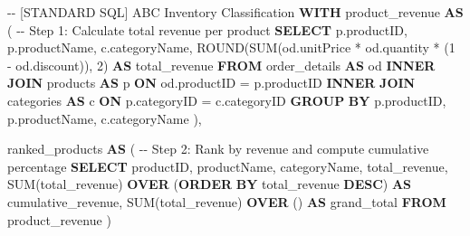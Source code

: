 \documentclass[
  letterpaper,
  DIV=11,
  numbers=noendperiod]{scrreprt}
\newenvironment{Shaded}{\begin{snugshade}}{\end{snugshade}}
\newcommand{\CommentTok}[1]{\textcolor[rgb]{0.37,0.37,0.37}{#1}}
\newcommand{\DecValTok}[1]{\textcolor[rgb]{0.68,0.00,0.00}{#1}}
\newcommand{\FunctionTok}[1]{\textcolor[rgb]{0.28,0.35,0.67}{#1}}
\newcommand{\KeywordTok}[1]{\textcolor[rgb]{0.00,0.23,0.31}{\textbf{#1}}}
\newcommand{\NormalTok}[1]{\textcolor[rgb]{0.00,0.23,0.31}{#1}}
\newcommand{\OperatorTok}[1]{\textcolor[rgb]{0.37,0.37,0.37}{#1}}
\begin{document}
\begin{codelisting}

\caption{\texttt{duckdb}}

\begin{Shaded}
\begin{Highlighting}[]
\CommentTok{{-}{-} [STANDARD SQL] ABC Inventory Classification}
\KeywordTok{WITH}\NormalTok{ product\_revenue }\KeywordTok{AS}\NormalTok{ (}
    \CommentTok{{-}{-} Step 1: Calculate total revenue per product}
    \KeywordTok{SELECT}
\NormalTok{        p.productID,}
\NormalTok{        p.productName,}
\NormalTok{        c.categoryName,}
        \FunctionTok{ROUND}\NormalTok{(}\FunctionTok{SUM}\NormalTok{(od.unitPrice }\OperatorTok{*}\NormalTok{ od.quantity }\OperatorTok{*}\NormalTok{ (}\DecValTok{1} \OperatorTok{{-}}\NormalTok{ od.discount)), }\DecValTok{2}\NormalTok{) }\KeywordTok{AS}\NormalTok{ total\_revenue}
    \KeywordTok{FROM}\NormalTok{ order\_details }\KeywordTok{AS}\NormalTok{ od}
    \KeywordTok{INNER} \KeywordTok{JOIN}\NormalTok{ products }\KeywordTok{AS}\NormalTok{ p }\KeywordTok{ON}\NormalTok{ od.productID }\OperatorTok{=}\NormalTok{ p.productID}
    \KeywordTok{INNER} \KeywordTok{JOIN}\NormalTok{ categories }\KeywordTok{AS}\NormalTok{ c }\KeywordTok{ON}\NormalTok{ p.categoryID }\OperatorTok{=}\NormalTok{ c.categoryID}
    \KeywordTok{GROUP} \KeywordTok{BY}\NormalTok{ p.productID, p.productName, c.categoryName}
\NormalTok{),}

\NormalTok{ranked\_products }\KeywordTok{AS}\NormalTok{ (}
    \CommentTok{{-}{-} Step 2: Rank by revenue and compute cumulative percentage}
    \KeywordTok{SELECT}
\NormalTok{        productID,}
\NormalTok{        productName,}
\NormalTok{        categoryName,}
\NormalTok{        total\_revenue,}
        \FunctionTok{SUM}\NormalTok{(total\_revenue) }\KeywordTok{OVER}\NormalTok{ (}\KeywordTok{ORDER} \KeywordTok{BY}\NormalTok{ total\_revenue }\KeywordTok{DESC}\NormalTok{) }\KeywordTok{AS}\NormalTok{ cumulative\_revenue,}
        \FunctionTok{SUM}\NormalTok{(total\_revenue) }\KeywordTok{OVER}\NormalTok{ () }\KeywordTok{AS}\NormalTok{ grand\_total}
    \KeywordTok{FROM}\NormalTok{ product\_revenue}
\NormalTok{)}


\end{Highlighting}
\end{Shaded}
\end{codelisting}
\end{document}
